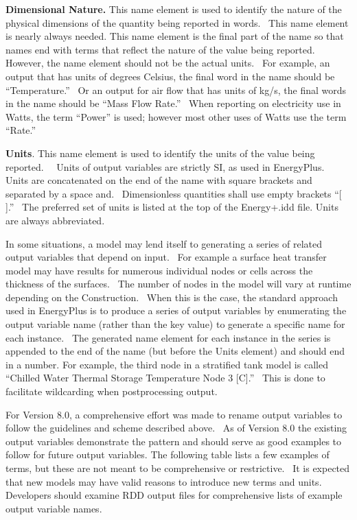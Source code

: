 \textbf{Dimensional Nature.} This name element is used to identify the nature of the physical dimensions of the quantity being reported in words.~ This name element is nearly always needed. This name element is the final part of the name so that names end with terms that reflect the nature of the value being reported. However, the name element should not be the actual units.~ For example, an output that has units of degrees Celsius, the final word in the name should be ``Temperature.''~ Or an output for air flow that has units of kg/s, the final words in the name should be ``Mass Flow Rate.''~ When reporting on electricity use in Watts, the term ``Power'' is used; however most other uses of Watts use the term ``Rate.''

\textbf{Units}. This name element is used to identify the units of the value being reported.~ ~Units of output variables are strictly SI, as used in EnergyPlus.~ Units are concatenated on the end of the name with square brackets and separated by a space and.~ Dimensionless quantities shall use empty brackets ``{[} {]}.''~ The preferred set of units is listed at the top of the Energy+.idd file. Units are always abbreviated.

In some situations, a model may lend itself to generating a series of related output variables that depend on input.~ For example a surface heat transfer model may have results for numerous individual nodes or cells across the thickness of the surfaces.~ The number of nodes in the model will vary at runtime depending on the Construction.~ When this is the case, the standard approach used in EnergyPlus is to produce a series of output variables by enumerating the output variable name (rather than the key value) to generate a specific name for each instance.~ The generated name element for each instance in the series is appended to the end of the name (but before the Units element) and should end in a number. For example, the third node in a stratified tank model is called ``Chilled Water Thermal Storage Temperature Node 3 {[}C{]}.''~ This is done to facilitate wildcarding when postprocessing output.

For Version 8.0, a comprehensive effort was made to rename output variables to follow the guidelines and scheme described above.~ As of Version 8.0 the existing output variables demonstrate the pattern and should serve as good examples to follow for future output variables. The following table lists a few examples of terms, but these are not meant to be comprehensive or restrictive.~ It is expected that new models may have valid reasons to introduce new terms and units. Developers should examine RDD output files for comprehensive lists of example output variable names.

